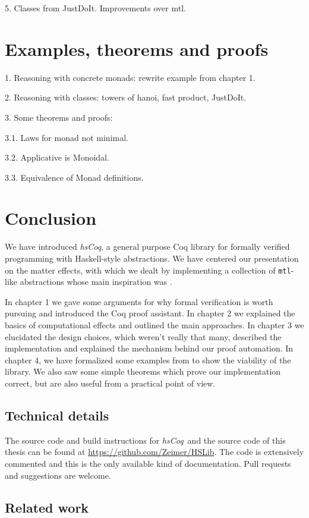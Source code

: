 \documentclass[declaration,inz,english,shortabstract]{iithesis}
\newcommand{\libname}{\textit{hsCoq}}
\newcommand{\homepage}{\url{https://github.com/Zeimer/HSLib}}
\newcommand{\m}[1]{\texttt{#1}}
\begin{document}
5. Classes from JustDoIt. Improvements over mtl.

\chapter{Examples, theorems and proofs}

1. Reasoning with concrete monads: rewrite example from chapter 1.

2. Reasoning with classes: towers of hanoi, fast product, JustDoIt.

3. Some theorems and proofs:

3.1. Laws for monad not minimal.

3.2. Applicative is Monoidal.

3.3. Equivalence of Monad definitions.

\chapter{Conclusion}

We have introduced \libname, a general purpose Coq library for formally verified programming with Haskell-style abstractions. We have centered our presentation on the matter effects, with which we dealt by implementing a collection of \m{mtl}-like abstractions whose main inspiration was \cite{JustDoIt}.

In chapter 1 we gave some arguments for why formal verification is worth pursuing and introduced the Coq proof assistant. In chapter 2 we explained the basics of computational effects and outlined the main approaches. In chapter 3 we elucidated the design choices, which weren't really that many, described the implementation and explained the mechanism behind our proof automation. In chapter 4, we have formalized some examples from \cite{JustDoIt} to show the viability of the library. We also saw some simple theorems which prove our implementation correct, but are also useful from a practical point of view.

\section{Technical details}

The source code and build instructions for \libname\ and the source code of this thesis can be found at \homepage. The code is extensively commented and this is the only available kind of documentation. Pull requests and suggestions are welcome.

\section{Related work}
\end{document}
